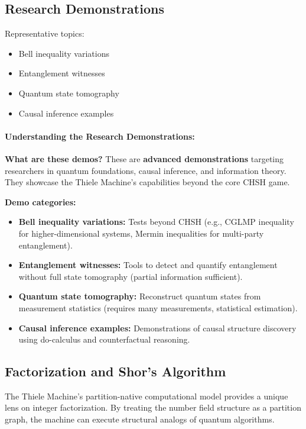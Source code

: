 \subsection{Research Demonstrations}

Representative topics:
\begin{itemize}
    \item Bell inequality variations
    \item Entanglement witnesses
    \item Quantum state tomography
    \item Causal inference examples
\end{itemize}

\paragraph{Understanding the Research Demonstrations:}

\textbf{What are these demos?} These are \textbf{advanced demonstrations} targeting researchers in quantum foundations, causal inference, and information theory. They showcase the Thiele Machine's capabilities beyond the core CHSH game.

\textbf{Demo categories:}
\begin{itemize}
    \item \textbf{Bell inequality variations:} Tests beyond CHSH (e.g., CGLMP inequality for higher-dimensional systems, Mermin inequalities for multi-party entanglement).
    
    \item \textbf{Entanglement witnesses:} Tools to detect and quantify entanglement without full state tomography (partial information sufficient).
    
    \item \textbf{Quantum state tomography:} Reconstruct quantum states from measurement statistics (requires many measurements, statistical estimation).
    
    \item \textbf{Causal inference examples:} Demonstrations of causal structure discovery using do-calculus and counterfactual reasoning.
\end{itemize}


\subsection{Factorization and Shor's Algorithm}

The Thiele Machine's partition-native computational model provides a unique lens on integer factorization. By treating the number field structure as a partition graph, the machine can execute structural analogs of quantum algorithms.


